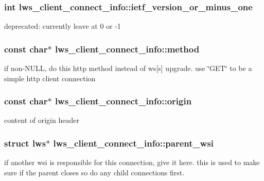 \subsubsection[{\texorpdfstring{ietf\+\_\+version\+\_\+or\+\_\+minus\+\_\+one}{ietf\_version\_or\_minus\_one}}]{\setlength{\rightskip}{0pt plus 5cm}int lws\+\_\+client\+\_\+connect\+\_\+info\+::ietf\+\_\+version\+\_\+or\+\_\+minus\+\_\+one}\hypertarget{structlws__client__connect__info_a69abb5aeed755750b9755e5c91db6895}{}\label{structlws__client__connect__info_a69abb5aeed755750b9755e5c91db6895}
deprecated\+: currently leave at 0 or -\/1 
\subsubsection[{\texorpdfstring{method}{method}}]{\setlength{\rightskip}{0pt plus 5cm}const char$\ast$ lws\+\_\+client\+\_\+connect\+\_\+info\+::method}\hypertarget{structlws__client__connect__info_aa9e8e3da4e783a0651b0dea62c2dd1db}{}\label{structlws__client__connect__info_aa9e8e3da4e783a0651b0dea62c2dd1db}
if non-\/\+N\+U\+LL, do this http method instead of ws\mbox{[}s\mbox{]} upgrade. use \char`\"{}\+G\+E\+T\char`\"{} to be a simple http client connection 
\subsubsection[{\texorpdfstring{origin}{origin}}]{\setlength{\rightskip}{0pt plus 5cm}const char$\ast$ lws\+\_\+client\+\_\+connect\+\_\+info\+::origin}\hypertarget{structlws__client__connect__info_a8595f83e64147cb687b6418cf500dd4c}{}\label{structlws__client__connect__info_a8595f83e64147cb687b6418cf500dd4c}
content of origin header 
\subsubsection[{\texorpdfstring{parent\+\_\+wsi}{parent\_wsi}}]{\setlength{\rightskip}{0pt plus 5cm}struct lws$\ast$ lws\+\_\+client\+\_\+connect\+\_\+info\+::parent\+\_\+wsi}\hypertarget{structlws__client__connect__info_a6843a60e1050b10db9d98d7eeb45f587}{}\label{structlws__client__connect__info_a6843a60e1050b10db9d98d7eeb45f587}
if another wsi is responsible for this connection, give it here. this is used to make sure if the parent closes so do any child connections first. 
